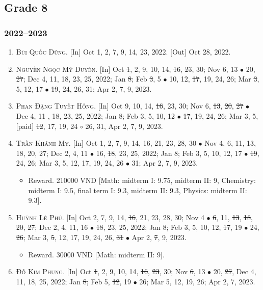 \documentclass{article}
\begin{document}
\subsection{Grade 8}

\subsubsection{2022--2023}

\begin{enumerate}
	\item \textsc{Bùi Quốc Dũng.} \textsf{[In]} Oct 1, 2, 7, 9, 14, 23, 2022. \textsf{[Out]} Oct 28, 2022.
	\item \textsc{Nguyễn Ngọc Mỹ Duyên.} \textsf{[In]} Oct \st{1}, 2, 9, 10, 14, \st{16}, \st{23}, 30; Nov \st{6}, 13 $\bullet$ 20, \st{27}; Dec 4, 11, 18, 23, 25, 2022; Jan \st{8}; Feb \st{3}, 5 $\bullet$ 10, 12, \st{17}, 19, 24, 26; Mar \st{3}, 5, 12, 17 $\bullet$ \st{19}, 24, 26, 31; Apr 2, 7, 9, 2023.
	\item \textsc{Phan Đặng Tuyết Hồng.} \textsf{[In]} Oct 9, 10, 14, \st{16}, 23, 30; Nov 6, \st{13}, \st{20}, \st{27} $\bullet$ Dec 4, 11 , 18, 23, 25, 2022; Jan 8; Feb \st{3}, 5, 10, 12 $\bullet$ \st{17}, 19, 24, 26; Mar 3, \st{5}, [paid] \st{12}, 17, 19, 24 $\circ$ 26, 31, Apr 2, 7, 9, 2023.
	\item \textsc{Trần Khánh My.} \textsf{[In]} Oct 1, 2, 7, 9, 14, 16, 21, 23, 28, 30 $\bullet$ Nov 4, 6, 11, 13, 18, 20, 27; Dec 2, 4, 11 $\bullet$ 16, \st{18}, 23, 25, 2022; Jan 8; Feb 3, 5, 10, 12, 17 $\bullet$ \st{19}, 24, 26; Mar 3, 5, 12, 17, 19, 24, 26 $\bullet$ 31; Apr 2, 7, 9, 2023.
	\begin{itemize}
		\item \textsf{Reward.} 210000 VND [Math: midterm I: 9.75, midterm II: 9,  Chemistry: midterm I: 9.5, final term I: 9.3, midterm II: 9.3, Physics: midterm II: 9.3].
	\end{itemize}
	\item \textsc{Huỳnh Lê Phú.} \textsf{[In]} Oct 2, 7, 9, 14, \st{16}, 21, 23, 28, 30; Nov 4 $\bullet$ \st{6}, 11, \st{13}, \st{18}, \st{20}, \st{27}; Dec 2, 4, 11, 16 $\bullet$ \st{18}, 23, 25, 2022; Jan 8; Feb \st{3}, 5, 10, 12, \st{17}, 19 $\bullet$ 24, \st{26}; Mar 3, \st{5}, 12, 17, 19, 24, 26, \st{31} $\bullet$ Apr 2, \st{7}, 9, 2023.
	\begin{itemize}
		\item \textsf{Reward.} 30000 VND [Math: midterm II: 9].
	\end{itemize}
	\item \textsc{Đỗ Kim Phụng.} \textsf{[In]} Oct \st{1}, 2, 9, 10, 14, \st{16}, \st{23}, 30; Nov \st{6}, 13 $\bullet$ 20, \st{27}, Dec 4, 11, 18, 25, 2022; Jan \st{8}; Feb 5, \st{12}, 19 $\bullet$ 26; Mar 5, 12, 19, 26; Apr 2, 7, 2023.

\end{enumerate}
\end{document}
